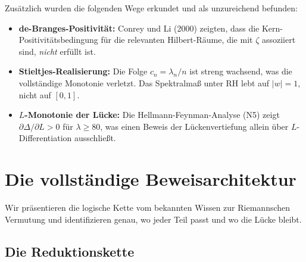 \documentclass[12pt,a4paper]{article}
\theoremstyle{definition}
\theoremstyle{remark}
\begin{document}
Zusätzlich wurden die folgenden Wege erkundet und als unzureichend befunden:
\begin{itemize}
  \item \textbf{de-Branges-Positivität:} Conrey und Li (2000) zeigten, dass die Kern-Positivitätsbedingung für die relevanten Hilbert-Räume, die mit $\zeta$ assoziiert sind, \emph{nicht} erfüllt ist.
  \item \textbf{Stieltjes-Realisierung:} Die Folge $c_n = \lambda_n/n$ ist streng wachsend, was die vollständige Monotonie verletzt. Das Spektralmaß unter RH lebt auf $|w| = 1$, nicht auf $[0,1]$.
  \item \textbf{$L$-Monotonie der Lücke:} Die Hellmann-Feynman-Analyse (N5) zeigt $\partial\Delta/\partial L > 0$ für $\lambda \geq 80$, was einen Beweis der Lückenvertiefung allein über $L$-Differentiation ausschließt.
\end{itemize}


\section{Die vollständige Beweisarchitektur}
\label{sec:architecture}

Wir präsentieren die logische Kette vom bekannten Wissen zur Riemannschen Vermutung und identifizieren genau, wo jeder Teil passt und wo die Lücke bleibt.

\subsection{Die Reduktionskette}
\end{document}
